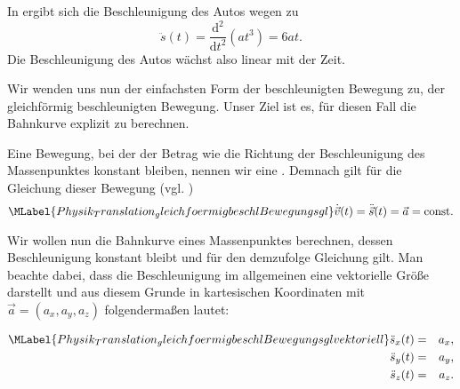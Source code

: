\begin{MContent}
\begin{MExercise}
     \begin{MSolution}
     In  ergibt sich die Beschleunigung des Autos wegen  zu
     $$
     \ddot{s}(t)=\frac{\textrm{d}^2}{\textrm{d}t^2}\left(at^3\right)=6at.
     $$ Die Beschleunigung des Autos w\"achst also linear mit der Zeit.\\
    
     \end{MSolution}
     \end{MExercise}
     
     
     
     
     
     Wir wenden uns nun der einfachsten Form der beschleunigten Bewegung zu, der gleichf\"ormig beschleunigten Bewegung. Unser Ziel ist es, f\"ur diesen Fall die Bahnkurve explizit zu berechnen. 
       
     \begin{MInfo}
     Eine Bewegung, bei der der Betrag wie die Richtung der Beschleunigung des Massenpunktes konstant bleiben, nennen wir eine .  Demnach gilt f\"ur die Gleichung dieser Bewegung (vgl. )
     \begin{equation}
     \MLabel{Physik_Translation_ gleichfoermigbeschlBewegungsgl}
     \dot{\vec{v}}(t)=\ddot{\vec{s}}(t)=\vec{a}=\textrm{const}.
     \end{equation}
     \end{MInfo}
     
     Wir wollen nun die Bahnkurve eines Massenpunktes berechnen, dessen Beschleunigung konstant bleibt und f\"ur den demzufolge Gleichung  gilt. Man beachte dabei, dass die Beschleunigung im allgemeinen eine vektorielle Gr\"o{\ss}e darstellt und aus diesem Grunde   in kartesischen Koordinaten mit $\vec{a}=(a_x,a_y,a_z)$ folgenderma{\ss}en lautet:
     
     \begin{eqnarray}
     \MLabel{Physik_Translation_ gleichfoermigbeschlBewegungsglvektoriell}
      \nonumber\ddot{s}_x(t)&=&a_x,\\
      \ddot{s}_y(t)&=&a_y,\\
      \nonumber\ddot{s}_z(t)&=&a_z.
     \end{eqnarray}
     

\end{MContent}
